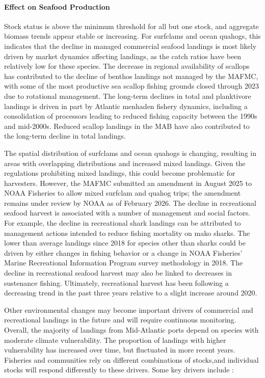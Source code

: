 \documentclass[
  10pt,
]{article}
\begin{document}
\paragraph{Effect on Seafood Production}\label{effect-on-seafood-production}

Stock status is above the minimum threshold for all but one stock, and aggregate biomass trends appear stable or increasing. For surfclams and ocean quahogs, this indicates that the decline in managed commercial seafood landings is most likely driven by market dynamics affecting landings, as the catch ratios have been relatively low for these species. The decrease in regional availability of scallops has contributed to the decline of benthos landings not managed by the MAFMC, with some of the most productive sea scallop fishing grounds closed through 2023 due to rotational management. The long-term declines in total and planktivore landings is driven in part by Atlantic menhaden fishery dynamics, including a consolidation of processors leading to reduced fishing capacity between the 1990s and mid-2000s. Reduced scallop landings in the MAB have also contributed to the long-term decline in total landings.

The spatial distribution of surfclams and ocean quahogs is changing, resulting in areas with overlapping distributions and increased mixed landings. Given the regulations prohibiting mixed landings, this could become problematic for harvesters. However, the MAFMC submitted an amendment in August 2025 to NOAA Fisheries to allow mixed surfclam and quahog trips; the amendment remains under review by NOAA as of February 2026.
The decline in recreational seafood harvest is associated with a number of management and social factors. For example, the decline in recreational shark landings can be attributed to management actions intended to reduce fishing mortality on mako sharks. The lower than average landings since 2018 for species other than sharks could be driven by either changes in fishing behavior or a change in NOAA Fisheries' Marine Recreational Information Program survey methodology in 2018. The decline in recreational seafood harvest may also be linked to decreases in sustenance fishing. Ultimately, recreational harvest has been following a decreasing trend in the past three years relative to a slight increase around 2020.

Other environmental changes may become important drivers of commercial and recreational landings in the future and will require continuous monitoring. Overall, the majority of landings from Mid-Atlantic ports depend on species with moderate climate vulnerability. The proportion of landings with higher vulnerability has increased over time, but fluctuated in more recent years. Fisheries and communities rely on different combinations of stocks,and individual stocks will respond differently to these drivers. Some key drivers include :
\end{document}

